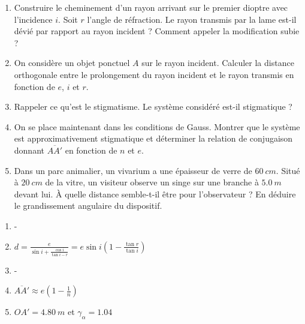 \begin{enumerate}
	\item Construire le cheminement d'un rayon arrivant sur le premier dioptre avec l'incidence $i$. Soit $r$ l'angle de réfraction. Le rayon transmis par la lame est-il dévié par rapport au rayon incident ? Comment appeler la modification subie ?
	\item On considère un objet ponctuel $A$ sur le rayon incident. Calculer la distance orthogonale  entre le prolongement du rayon incident et le rayon transmis en fonction de $e$, $i$ et $r$. 
	\item Rappeler ce qu'est le stigmatisme. Le système considéré est-il stigmatique ?
	\item On se place maintenant dans les conditions de Gauss. Montrer que le système est approximativement stigmatique et déterminer la relation de conjugaison donnant $\overline{AA'}$ en fonction de $n$ et $e$.
	\item Dans un parc animalier, un vivarium a une épaisseur de verre de $\SI{60}{cm}$. Situé à $\SI{20}{cm}$ de la vitre, un visiteur observe un singe sur une branche à $\SI{5.0}{m}$ devant lui. À quelle distance semble-t-il être pour l'observateur ? En déduire le grandissement angulaire du dispositif.
\end{enumerate}

\begin{enumerate}
	\item -
	\item $d = \frac{e}{\sin{i}+\frac{\cos{i}}{\tan{i-r}}} = e \sin{i} \left(1 - \frac{\tan{r}}{\tan{i}}\right)$
	\item -
	\item $\overline{AA'} \approx e \left(1 - \frac{1}{n}\right)$
	\item $OA' = \SI{4.80}{m}$ et $\gamma_\alpha = 1.04$
\end{enumerate}
